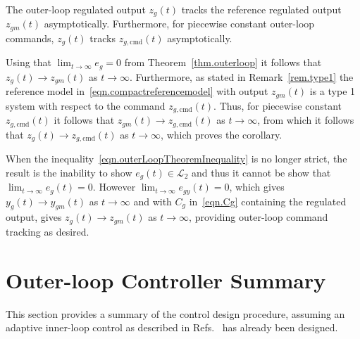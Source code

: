 \documentclass[journal]{IEEEtran}
\theoremstyle{innercustomthm}
\begin{document}
  \begin{cor-dan}\label{cor.zgcmdtracking}
    The outer-loop regulated output $z_{g}(t)$ tracks the reference regulated output $z_{gm}(t)$ asymptotically.
    Furthermore, for piecewise constant outer-loop commands, $z_{g}(t)$ tracks $z_{g,\text{cmd}}(t)$ asymptotically.
  \end{cor-dan}

  \begin{proof-dan}
    Using that $\lim_{t\rightarrow\infty}e_{g}=0$ from Theorem~\ref{thm.outerloop} it follows that $z_{g}(t)\rightarrow z_{gm}(t)$ as $t\rightarrow\infty$.
    Furthermore, as stated in Remark~\ref{rem.type1} the reference model in\ \eqref{eqn.compactreferencemodel} with output $z_{gm}(t)$ is a type 1 system with respect to the command $z_{g,\text{cmd}}(t)$.
    Thus, for piecewise constant $z_{g,\text{cmd}}(t)$ it follows that $z_{gm}(t)\rightarrow z_{g,\text{cmd}}(t)$ as $t\rightarrow\infty$, from which it follows that $z_{g}(t)\rightarrow z_{g,\text{cmd}}(t)$ as $t\rightarrow\infty$, which proves the corollary.
  \end{proof-dan}

  \begin{rem-dan}
    When the inequality\ \eqref{eqn.outerLoopTheoremInequality} is no longer strict, the result is the inability to show $e_{g}(t)\in\mathcal{L}_{2}$ and thus it cannot be show that $\lim_{t\rightarrow\infty}e_{g}(t)=0$.
    However $\lim_{t\rightarrow\infty}e_{gy}(t)=0$, which gives $y_{g}(t)\rightarrow y_{gm}(t)$ as $t\rightarrow\infty$ and with $C_{g}$ in\ \eqref{eqn.Cg} containing the regulated output, gives $z_{g}(t)\rightarrow z_{gm}(t)$ as $t\rightarrow\infty$, providing outer-loop command tracking as desired.
  \end{rem-dan}

  \section{Outer-loop Controller Summary}\label{sec.outerLoopDesignProcedureSummary}

  This section provides a summary of the control design procedure, assuming an adaptive inner-loop control as described in Refs.\ \cite{wiese.gnc.2015, wiese.jgcd.2015} has already been designed.
\end{document}
